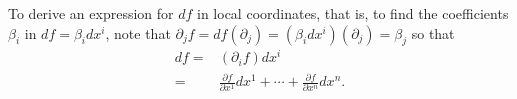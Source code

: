 To derive an expression for $df$ in local coordinates, that is, to find the coefficients $\beta_i$ in $df = \beta_i dx^i$, note that $\partial_j f = df(\partial_j) = (\beta_i dx^i)(\partial_j) = \beta_j$
so that %
\begin{equation}\begin{aligned}\label{eq:exact_differential_expansion}
df = & \left(\partial_i f \right)dx^i\\
= & \frac{\partial f}{\partial x^1}dx^1+\cdots + \frac{\partial f}{\partial x^n}dx^n. %
\end{aligned}\end{equation}
